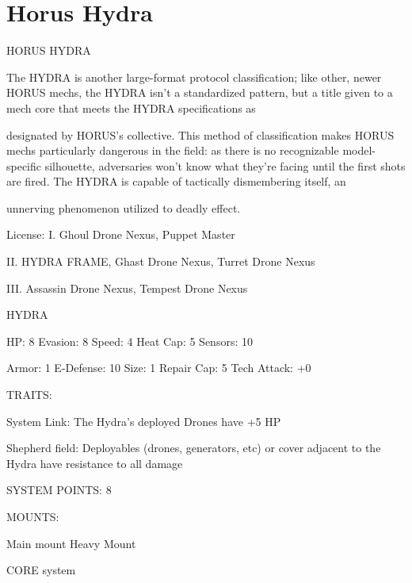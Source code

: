 \section{Horus Hydra}


                                           HORUS HYDRA  

The HYDRA is another large-format protocol classification; like other, newer HORUS mechs, the HYDRA  
isn’t a standardized pattern, but a title given to a mech core that meets the HYDRA specifications as  

designated by HORUS’s collective. This method of classification makes HORUS mechs particularly  
dangerous in the field: as there is no recognizable model-specific silhouette, adversaries won’t know what  
they’re facing until the first shots are fired. The HYDRA is capable of tactically dismembering itself, an  

unnerving phenomenon utilized to deadly effect.  

                                                  License:  
I. Ghoul Drone Nexus, Puppet Master
 
II. HYDRA FRAME, Ghast Drone Nexus, Turret Drone Nexus
 
III. Assassin Drone Nexus, Tempest Drone Nexus
 

                                                  HYDRA 

 HP: 8          Evasion: 8                            Speed:  4          Heat Cap: 5       Sensors: 10 

 Armor: 1       E-Defense: 10                         Size: 1            Repair Cap: 5     Tech Attack:  
                                                                                           +0 

                                                  TRAITS: 

 System Link: The Hydra’s deployed Drones have +5 HP
 
 Shepherd field: Deployables (drones, generators, etc) or cover adjacent to the Hydra have resistance  
 to all damage 

                                            SYSTEM POINTS: 8 

                                                 MOUNTS: 

 Main mount                        Heavy Mount 

                                               CORE system 

                                                                                                           


